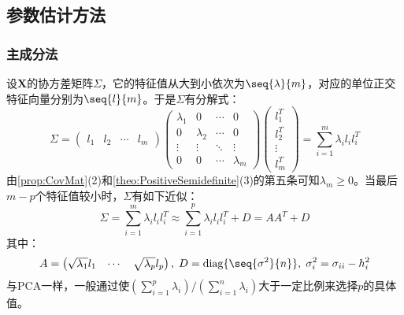 \subsection{参数估计方法}
\subsubsection{主成分法}
\begin{method}
	设$\mathbf{X}$的协方差矩阵$\Sigma$，它的特征值从大到小依次为$\seq{\lambda}{m}$，对应的单位正交特征向量分别为$\seq{l}{m}$。于是$\Sigma$有分解式：
	\begin{equation*}
		\Sigma=
		\begin{pmatrix}
			l_1 & l_2 & \cdots &l_m
		\end{pmatrix}
		\begin{pmatrix}
			\lambda_1 & 0 & \cdots & 0 \\
			0 & \lambda_2 & \cdots & 0 \\
			\vdots & \vdots & \ddots & \vdots \\
			0 & 0 & \cdots & \lambda_m
		\end{pmatrix}
		\begin{pmatrix}
			l_1^T \\
			l_2^T \\
			\vdots \\
			l_m^T
		\end{pmatrix}
		=\sum_{i=1}^{m}\lambda_il_il_i^T
	\end{equation*}
	由\cref{prop:CovMat}(2)和\cref{theo:PositiveSemidefinite}(3)的第五条可知$\lambda_m\geqslant0$。当最后$m-p$个特征值较小时，$\Sigma$有如下近似：
	\begin{equation*}
		\Sigma=\sum_{i=1}^{m}\lambda_il_il_i^T\approx\sum_{i=1}^{p}\lambda_il_il_i^T+D=AA^T+D
	\end{equation*}
	其中：
	\begin{equation*}
		A=
		\begin{pmatrix}
			\sqrt{\lambda_1}l_1 & \cdots & \sqrt{\lambda_p}l_p
		\end{pmatrix},\;
		D=\operatorname{diag}\{\seq{\sigma^2}{n}\},\;
		\sigma_i^2=\sigma_{ii}-h_i^2
	\end{equation*}
	与PCA一样，一般通过使$\left(\sum\limits_{i=1}^{p}\lambda_i\right)/\left(\sum\limits_{i=1}^{n}\lambda_i\right)$大于一定比例来选择$p$的具体值。
\end{method}
